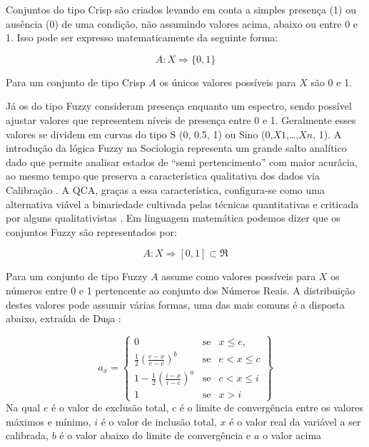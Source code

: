 \documentclass[
	12pt,				%
	oneside,			%
	a4paper,			%
	sumario=tradicional,
	english,			%
	brazil				%
	]{abntex2}
\begin{document}
Conjuntos do tipo Crisp são criados levando em conta a simples presença (1) ou ausência (0) de uma condição, não assumindo valores acima, abaixo ou entre 0 e 1. Isso pode ser expresso matematicamente da seguinte forma:

\[ A:X \Rightarrow \{0,1\} \]

Para um conjunto de tipo Crisp \(A\) os únicos valores possíveis para \(X\) são 0 e 1.

Já os do tipo Fuzzy consideram presença enquanto um espectro, sendo possível ajustar valores que representem níveis de presença entre 0 e 1. Geralmente esses valores se dividem em curvas do tipo S (0, 0.5, 1) ou Sino (0,\(X1\),\ldots,\(Xn\), 1). A introdução da lógica Fuzzy na Sociologia representa um grande salto analítico dado que permite analisar estados de ``semi pertencimento'' com maior acurâcia, ao mesmo tempo que preserva a característica qualitativa dos dados via Calibração \autocites[08]{ragin_redesigning_2008}[18]{schneider_set-theoretic_2012}. A QCA, graças a essa característica, configura-se como uma alternativa viável a binariedade cultivada pelas técnicas quantitativas e criticada por alguns qualitativistas \autocite{mahoney_tale_2006}. Em linguagem matemática podemos dizer que os conjuntos Fuzzy são representados por:

\[ A:X \Rightarrow [0,1]  \subset \Re \]

Para um conjunto de tipo Fuzzy \(A\) assume como valores possíveis para \(X\) os números entre 0 e 1 pertencente ao conjunto dos Números \acrshort{Reais}. A distribuição destes valores pode assumir várias formas, uma das mais comuns é a disposta abaixo, extraída de Duşa \autocite*{dusa_qca_2018}:

\[ a_{x} = \begin{Bmatrix}
0 & \mbox {se} & x\leq e, \\ 
\frac{1}{2}  \left (\frac{e - x}{e - c} \right)^b & \mbox {se} &  e< x\leq c\\ 
1 - \frac{1}{2} \left (\frac{i - x}{i - c} \right)^a &\mbox {se} & c < x \leq i \\
1 & \mbox {se} & x > i  
\end{Bmatrix} \]
Na qual \(e\) é o valor de exclusão total, \(c\) é o limite de convergência entre os valores máximos e mínimo, \(i\) é o valor de inclusão total, \(x\) é o valor real da variável a ser calibrada, \(b\) é o valor abaixo do limite de convergência e \(a\) o valor acima \autocite[82]{dusa_qca_2018}
\end{document}
